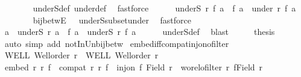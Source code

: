 \begin{isabellebody}
\ \ \ \ \ \ \isamarkupfalse%
\ underS{\isacharunderscore}{\kern0pt}def\ under{\isacharunderscore}{\kern0pt}def\ \isamarkupfalse%
\ fastforce\isanewline
\ \ \ \ \isamarkupfalse%
\ {\isachardoublequoteopen}underS\ r{\isacharprime}{\kern0pt}\ {\isacharparenleft}{\kern0pt}f\ a{\isacharparenright}{\kern0pt}\ {\isasymunion}\ {\isacharbraceleft}{\kern0pt}f\ a{\isacharbraceright}{\kern0pt}\ {\isasymsubseteq}\ under\ r{\isacharprime}{\kern0pt}\ {\isacharparenleft}{\kern0pt}f\ a{\isacharparenright}{\kern0pt}{\isachardoublequoteclose}\isanewline
\ \ \ \ \ \ \isamarkupfalse%
\ bij{\isacharunderscore}{\kern0pt}betwE\ {}\ {}\ underS{\isacharunderscore}{\kern0pt}subset{\isacharunderscore}{\kern0pt}under\ \isamarkupfalse%
\ fastforce\isanewline
\ \ \isamarkupfalse%
\isanewline
\ \ \isamarkupfalse%
\ \isamarkupfalse%
\ {\isachardoublequoteopen}a\ {\isasymnotin}\ underS\ r\ a\ {\isasymand}\ f\ a\ {\isasymnotin}\ underS\ r{\isacharprime}{\kern0pt}\ {\isacharparenleft}{\kern0pt}f\ a{\isacharparenright}{\kern0pt}{\isachardoublequoteclose}\isanewline
\ \ \ \ \isamarkupfalse%
\ underS{\isacharunderscore}{\kern0pt}def\ \isamarkupfalse%
\ blast\isanewline
\ \ \isamarkupfalse%
\ \isamarkupfalse%
\ {\isacharquery}{\kern0pt}thesis\isanewline
\ \ \ \ \isamarkupfalse%
\ {\isacharparenleft}{\kern0pt}auto\ simp\ add{\isacharcolon}{\kern0pt}\ notIn{\isacharunderscore}{\kern0pt}Un{\isacharunderscore}{\kern0pt}bij{\isacharunderscore}{\kern0pt}betw{}{\isacharparenright}{\kern0pt}\isanewline
{}\isamarkupfalse%
%
\endisatagproof
{\isafoldproof}%
%
\isadelimproof
\isanewline
%
\endisadelimproof
\isanewline
{}\isamarkupfalse%
\ embed{\isacharunderscore}{\kern0pt}iff{\isacharunderscore}{\kern0pt}compat{\isacharunderscore}{\kern0pt}inj{\isacharunderscore}{\kern0pt}on{\isacharunderscore}{\kern0pt}ofilter{\isacharcolon}{\kern0pt}\isanewline
{}\ WELL{\isacharcolon}{\kern0pt}\ {\isachardoublequoteopen}Well{\isacharunderscore}{\kern0pt}order\ r{\isachardoublequoteclose}\ \ WELL{\isacharprime}{\kern0pt}{\isacharcolon}{\kern0pt}\ {\isachardoublequoteopen}Well{\isacharunderscore}{\kern0pt}order\ r{\isacharprime}{\kern0pt}{\isachardoublequoteclose}\isanewline
{}\ {\isachardoublequoteopen}embed\ r\ r{\isacharprime}{\kern0pt}\ f\ {\isacharequal}{\kern0pt}\ {\isacharparenleft}{\kern0pt}compat\ r\ r{\isacharprime}{\kern0pt}\ f\ {\isasymand}\ inj{\isacharunderscore}{\kern0pt}on\ f\ {\isacharparenleft}{\kern0pt}Field\ r{\isacharparenright}{\kern0pt}\ {\isasymand}\ wo{\isacharunderscore}{\kern0pt}rel{\isachardot}{\kern0pt}ofilter\ r{\isacharprime}{\kern0pt}\ {\isacharparenleft}{\kern0pt}f{\isacharbackquote}{\kern0pt}{\isacharparenleft}{\kern0pt}Field\ r{\isacharparenright}{\kern0pt}{\isacharparenright}{\kern0pt}{\isacharparenright}{\kern0pt}{\isachardoublequoteclose}\isanewline

\end{isabellebody}
